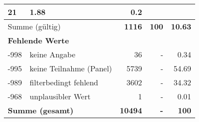 \begin{longtable}{lXrrr}
       \num{21} &
       \num[round-mode=places,round-precision=2]{1.88} &
         \num[round-mode=places,round-precision=2]{0.2} \\
     \midrule
     \multicolumn{2}{l}{Summe (gültig)} &
       \textbf{\num{1116}} &
     \textbf{\num{100}} &
       \textbf{\num[round-mode=places,round-precision=2]{10.63}} \\
     \multicolumn{5}{l}{\textbf{Fehlende Werte}}\\
       -998 &
       keine Angabe &
         \num{36} &
        - &
         \num[round-mode=places,round-precision=2]{0.34} \\
       -995 &
       keine Teilnahme (Panel) &
         \num{5739} &
        - &
         \num[round-mode=places,round-precision=2]{54.69} \\
       -989 &
       filterbedingt fehlend &
         \num{3602} &
        - &
         \num[round-mode=places,round-precision=2]{34.32} \\
       -968 &
       unplausibler Wert &
         \num{1} &
        - &
         \num[round-mode=places,round-precision=2]{0.01} \\
     \midrule
     \multicolumn{2}{l}{\textbf{Summe (gesamt)}} &
          \textbf{\num{10494}} &
        \textbf{-} &
        \textbf{\num{100}} \\
     \bottomrule
     \end{longtable}
     
